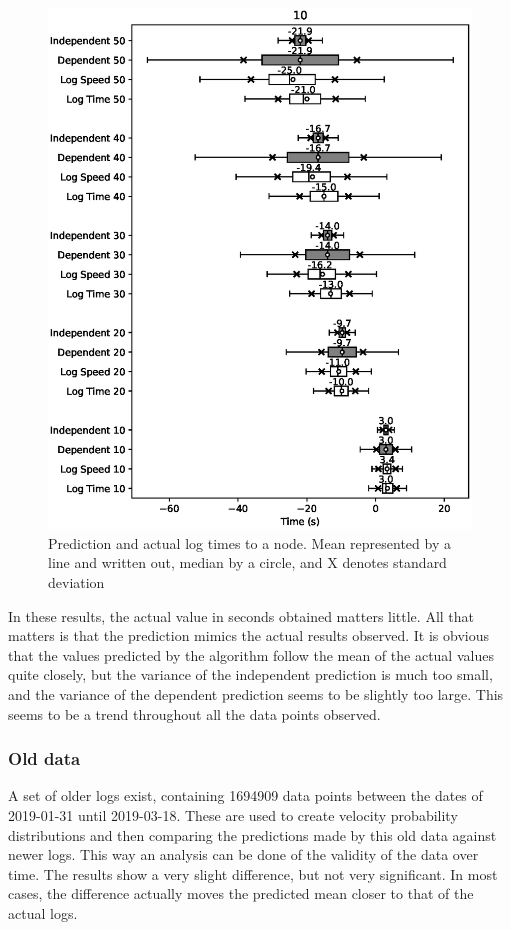\documentclass{article}
\begin{document}
				\begin{figure}[H]
					\includegraphics[scale=0.7]{10.eps}
					\caption{Prediction and actual log times to a node. Mean represented by a line and written out, median by a circle, and X denotes standard deviation}
					\label{fig:box3}
				\end{figure}

				In these results, the actual value in seconds obtained matters little. All that matters is that the prediction mimics the actual results observed. It is obvious that the values predicted by the algorithm follow the mean of the actual values quite closely, but the variance of the independent prediction is much too small, and the variance of the dependent prediction seems to be slightly too large. This seems to be a trend throughout all the data points observed.

			\subsubsection{Old data}
				A set of older logs exist, containing 1694909 data points between the dates of 2019-01-31 until 2019-03-18. These are used to create velocity probability distributions and then comparing the predictions made by this old data against newer logs. This way an analysis can be done of the validity of the data over time. The results show a very slight difference, but not very significant. In most cases, the difference actually moves the predicted mean closer to that of the actual logs.
\end{document}
